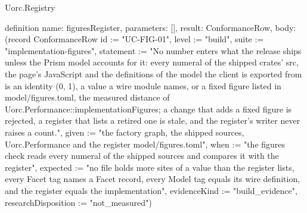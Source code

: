 \begin{lexlean}{Uorc.Registry}
\begin{semanticmodule}
definition{
  name: figuresRegister,
  parameters: [],
  result: ConformanceRow,
  body: (record ConformanceRow {id := "UC-FIG-01", level := "build", suite := "implementation-figures", statement := "No number enters what the release ships unless the Prism model accounts for it: every numeral of the shipped crates' src, the page's JavaScript and the definitions of the model the client is exported from is an identity (0, 1), a value a wire module names, or a fixed figure listed in model/figures.toml, the measured distance of Uorc.Performance::implementationFigures; a change that adds a fixed figure is rejected, a register that lists a retired one is stale, and the register's writer never raises a count.", given := "the factory graph, the shipped sources, Uorc.Performance and the register model/figures.toml", when := "the figures check reads every numeral of the shipped sources and compares it with the register", expected := "no file holds more sites of a value than the register lists, every Facet tag names a Facet record, every Model tag equals its wire definition, and the register equals the implementation", evidenceKind := "build_evidence", researchDisposition := "not_measured"})
}
\end{semanticmodule}
\end{lexlean}
